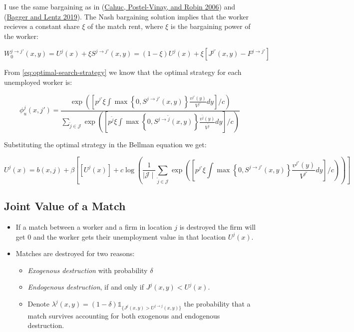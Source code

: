 \documentclass[
  letterpaper,
  DIV=11,
  numbers=noendperiod]{scrreprt}
\providecommand{\tightlist}{%
  \setlength{\itemsep}{0pt}\setlength{\parskip}{0pt}}\usepackage{longtable,booktabs,array}
\begin{document}
I use the same bargaining as in
(\protect\hyperlink{ref-cahucWageBargainingOntheJob2006}{Cahuc,
Postel-Vinay, and Robin 2006}) and
(\protect\hyperlink{ref-baggerEmpiricalModelWage2019a}{Bagger and Lentz
2019}). The Nash bargaining solution implies that the worker recieves a
constant share \(\xi\) of the match rent, where \(\xi\) is the
bargaining power of the worker:

\[W^{j \to j'}_{0}(x,y) = U^{j}(x) + \xi S^{j\to j'}(x,y) =  (1 - \xi) U^{j}(x) + \xi [J^{j'}(x,y) - F^{j \to j'}]\]

From \eqref{eq:optimal-search-strategy} we know that the optimal
strategy for each unemployed worker is:

\begin{equation}\label{eq-optimal-search-unemployed}
\phi_{u}^{j}(x,j')=\frac{\exp{\left(\left[p^{j'} \xi \int \max\left\{0, S^{j\to j'}(x,y) \right\}\frac{v^{j'}(y)}{V^{j'}}dy \right] / c\right)}}{\sum_{\tilde{j}\in \mathcal{J}}\exp{\left(\left[p^{\tilde{j}} \xi \int \max\left\{0, S^{j\to \tilde{j} }(x,y) \right\}\frac{v^{ \tilde{j} }(y)}{V^{\tilde{j}}}dy \right] / c\right)}}
\end{equation}

Substituting the optimal strategy in the Bellman equation we get:

\begin{equation}\label{eq-bellman-unemployed}
U^{j}(x) = b(x,j) + \beta\left[\left[U^j(x)\right]  + c\log\left(\frac{1}{\mid \mathcal{J} \mid }{\sum_{\tilde{j}\in \mathcal{J}}\exp{\left(\left[p^{j'} \xi \int \max\left\{0, S^{j\to j' }(x,y) \right\}\frac{v^{ j' }(y)}{V^{j'}}dy \right] / c\right)}} \right)\right]  
\end{equation}

\hypertarget{joint-value-of-a-match}{%
\subsection{Joint Value of a Match}\label{joint-value-of-a-match}}

\begin{itemize}
\tightlist
\item
  If a match between a worker and a firm in location \(j\) is destroyed
  the firm will get \(0\) and the worker gets their unemployment value
  in that location \(U^{j}(x)\).
\item
  Matches are destroyed for two reasons:

  \begin{itemize}
  \tightlist
  \item
    \emph{Exogenous destruction} with probability \(\delta\)
  \item
    \emph{Endogenous destruction}, if and only if \(J^j(x,y) < U^j(x)\).
  \item
    Denote
    \(\lambda^j(x,y) = (1-\delta)\mathbb{1}_{\{J^j(x,y)>U^{j\to j}(x,y)\}}\)
    the probability that a match survives accounting for both exogenous
    and endogenous destruction.
  \end{itemize}
\end{itemize}
\end{document}
